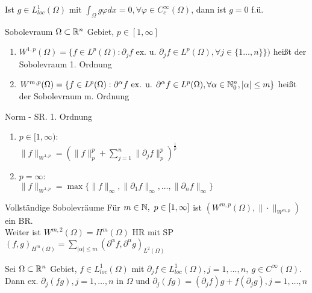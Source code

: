 \begin{korrolar}
    Ist \(g\in L_{loc}^1(\Omega)\) mit \(\int_\Omega g\varphi dx = 0,
    \forall \varphi \in C_c^\infty(\Omega)\), dann ist \(g=0\) f.ü.
\end{korrolar}
    
\begin{definition}{Sobolevraum}
    \(\Omega \subset \mathbb{R}^n\) Gebiet, \(p \in [1,\infty]\)
    \begin{enumerate}[label=(\roman*)]
        \item \(W^{1,p}(\Omega) = \{
            f\in L^p(\Omega):\partial_jf\text{ ex. u. } \partial_j f
            \in L^p(\Omega),\forall j\in\{1\dots,n\}\})\) heißt der Sobolevraum
            1. Ordnung
        \item \(W^{m,p}(\Omega) = \{f\in L^p(\Omega):\partial^\alpha f 
            \text{ ex. u. } \partial^\alpha f \in L^p(\Omega),
            \forall\alpha\in\mathbb{N}_0^n, |\alpha|\leq m\}\) heißt der Sobolevraum
            m. Ordnung
    \end{enumerate}
\end{definition}

\begin{definition}{Norm - SR. 1. Ordnung}

    \begin{enumerate}[label=(\roman*)]
        \item \(p\in [1,\infty)\):\\
            \( \|f\|_{W^{1,p}} = (\|f\|_p^p +
            \sum_{j=1}^{n}\|\partial_jf\|_p^p)^{\frac{1}{p}} \)
        \item \(p = \infty\):\\
            \( \|f\|_{W^{1,p}} =
            \max\{\|f\|_\infty, \|\partial_1f\|_\infty, \dots,
            \|\partial_nf\|_\infty \} \)
    \end{enumerate}
\end{definition}

\begin{satz}{Vollständige Sobolevräume}
    Für \(m \in \mathbb{N},\ p\in [1,\infty]\) ist
    \((W^{m,p}(\Omega),\|\cdot\|_{W^{m,p}})\) ein BR.\\
    Weiter ist \(W^{m,2}(\Omega)=H^m(\Omega)\) HR mit SP
    \((f,g)_{H^m(\Omega)}=\sum_{|\alpha|\leq m}
    (\partial^\alpha f,\partial^\alpha g)_{L^2(\Omega)}\)
\end{satz}

\begin{lemma}
    Sei \(\Omega \subset \mathbb{R}^n\) Gebiet, \(f\in L_{loc}^1(\Omega)\) mit
    \(\partial_jf\in L_{loc}^1(\Omega), j=1,\dots,n,\ g\in
    C^\infty(\Omega)\).
    Dann ex. \(\partial_j(fg), j=1,\dots,n\) in \(\Omega\) und 
    \(\partial_j(fg)= (\partial_jf)g + f(\partial_jg), j=1,\dots,n\)
\end{lemma}

